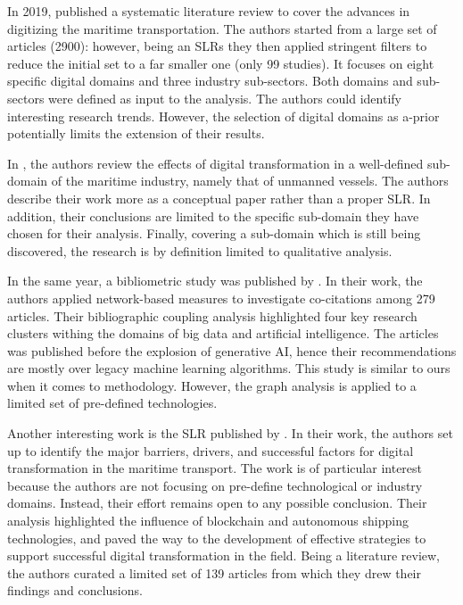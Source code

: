 \documentclass[jmse,review,submit,pdftex,moreauthors]{Definitions/mdpi}
\begin{document}
In 2019, \citep{sanchez2019toward} published a systematic literature review to cover the advances in digitizing the maritime transportation. The authors started from a large set of articles (2900): however, being an SLRs they then applied stringent filters to reduce the initial set to a far smaller one (only 99 studies). It focuses on eight specific digital domains and three industry sub-sectors. Both domains and sub-sectors were defined as input to the analysis. The authors could identify interesting research trends. However, the selection of digital domains as a-prior potentially limits the extension of their results.

In \citep{poulis2020value}, the authors review the effects of digital transformation in a well-defined sub-domain of the maritime industry, namely that of unmanned vessels. The authors describe their work more as a conceptual paper rather than a proper SLR. In addition, their conclusions are limited to the specific sub-domain they have chosen for their analysis. Finally, covering a sub-domain which is still being discovered, the research is by definition limited to qualitative analysis.

In the same year, a bibliometric study was published by \citep{munim2020big}. In their work, the authors applied network-based measures to investigate co-citations among 279 articles. Their bibliographic coupling analysis highlighted four key research clusters withing the domains of big data and artificial intelligence. The articles was published before the explosion of generative AI, hence their recommendations are mostly over legacy machine learning algorithms. This study is similar to ours when it comes to methodology. However, the graph analysis is applied to a limited set of pre-defined technologies.

Another interesting work is the SLR published by \citep{tijan2021digital}. In their work, the authors set up to identify the major barriers, drivers, and successful factors for digital transformation in the maritime transport. The work is of particular interest because the authors are not focusing on pre-define technological or industry domains. Instead, their effort remains open to any possible conclusion. Their analysis highlighted the influence of blockchain and autonomous shipping technologies, and paved the way to the development of effective strategies to support successful digital transformation in the field. Being a literature review, the authors curated a limited set of 139 articles from which they drew their findings and conclusions.
\end{document}
